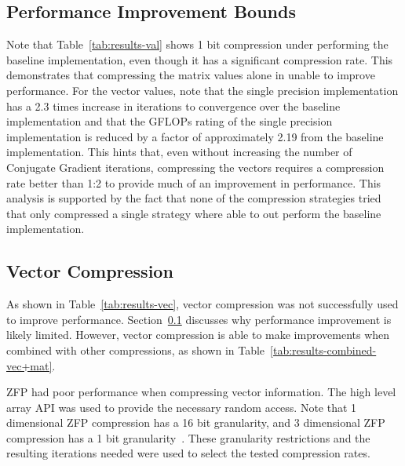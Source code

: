 

\subsection{Performance Improvement Bounds}
\label{sec:results-bounds}
Note that Table~\ref{tab:results-val} shows 1 bit compression under performing the baseline implementation, even though it has a significant compression rate.
This demonstrates that compressing the matrix values alone in unable to improve performance.
For the vector values, note that the single precision implementation has a 2.3 times increase in iterations to convergence over the baseline implementation and that the GFLOPs rating of the single precision implementation is reduced by a factor of approximately 2.19 from the baseline implementation.
This hints that, even without increasing the number of Conjugate Gradient iterations, compressing the vectors requires a compression rate better than 1:2 to provide much of an improvement in performance.
This analysis is supported by the fact that none of the compression strategies tried that only compressed a single strategy where able to out perform the baseline implementation.

\subsection{Vector Compression}
\label{sec:results-vec}
As shown in Table~\ref{tab:results-vec}, vector compression was not successfully used to improve performance.
Section~\ref{sec:results-bounds} discusses why performance improvement is likely limited.
However, vector compression is able to make improvements when combined with other compressions, as shown in Table~\ref{tab:results-combined-vec+mat}.

ZFP had poor performance when compressing vector information.
The high level array API was used to provide the necessary random access.
Note that 1 dimensional ZFP compression has a 16 bit granularity, and 3 dimensional ZFP compression has a 1 bit granularity~\cite{Lindstrom:2014:zfp}.
These granularity restrictions and the resulting iterations needed were used to select the tested compression rates.

